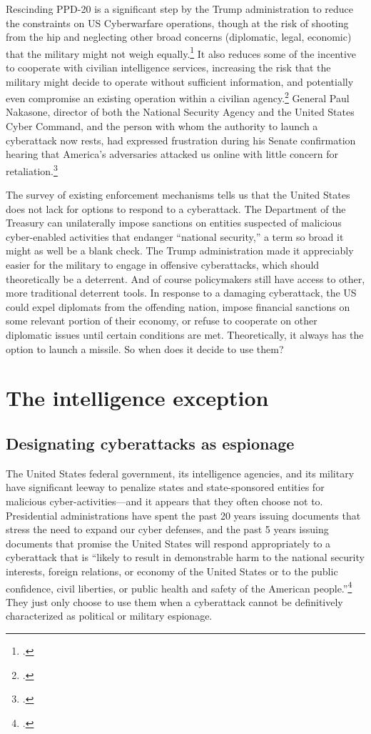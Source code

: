 \documentclass{memoir}
\begin{document}
\begin{refsegment}
Rescinding PPD-20 is a significant step by the Trump administration to reduce the constraints on US Cyberwarfare operations, though at the risk of shooting from the hip and neglecting other broad concerns (diplomatic, legal, economic) that the military might not weigh equally.\footcite{starks_ramifications_2018} It also reduces some of the incentive to cooperate with civilian intelligence services, increasing the risk that the military might decide to operate without sufficient information, and potentially even compromise an existing operation within a civilian agency.\footcite{hawkins_cybersecurity_2018} General Paul Nakasone, director of both the National Security Agency and the United States Cyber Command, and the person with whom the authority to launch a cyberattack now rests, had expressed frustration during his Senate confirmation hearing that America's adversaries attacked us online with little concern for retaliation.\footcite{sanger_trump_2018}

The survey of existing enforcement mechanisms tells us that the United States does not lack for options to respond to a cyberattack. The Department of the Treasury can unilaterally impose sanctions on entities suspected of malicious cyber-enabled activities that endanger ``national security,'' a term so broad it might as well be a blank check. The Trump administration made it appreciably easier for the military to engage in offensive cyberattacks, which should theoretically be a deterrent. And of course policymakers still have access to other, more traditional deterrent tools. In response to a damaging cyberattack, the US could expel diplomats from the offending nation, impose financial sanctions on some relevant portion of their economy, or refuse to cooperate on other diplomatic issues until certain conditions are met. Theoretically, it always has the option to launch a missile. So when does it decide to use them?

\section{The intelligence exception}
\subsection{Designating cyberattacks as espionage}
The United States federal government, its intelligence agencies, and its military have significant leeway to penalize states and state-sponsored entities for malicious cyber-activities---and it appears that they often choose not to. Presidential administrations have spent the past 20 years issuing documents that stress the need to expand our cyber defenses, and the past 5 years issuing documents that promise the United States will respond appropriately to a cyberattack that is ``likely to result in demonstrable harm to the national security interests, foreign relations, or economy of the United States or to the public confidence, civil liberties, or public health and safety of the American people.''\footcite{office_of_the_press_secretary_fact_2016} They just only choose to use them when a cyberattack cannot be definitively characterized as political or military espionage.


\end{refsegment}
\end{document}
